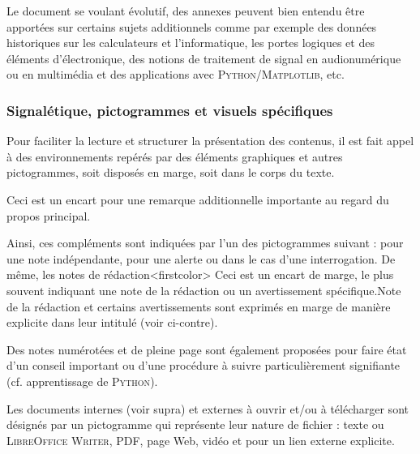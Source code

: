 Le document se voulant évolutif, des annexes peuvent bien entendu être apportées sur certains sujets additionnels comme par exemple des données historiques sur les calculateurs et l'informatique, les portes logiques et des éléments d'électronique, des notions de traitement de signal en audionumérique ou en multimédia et des applications avec \textsc{Python}/\textsc{Matplotlib}, etc.


\subsubsection*{Signalétique, pictogrammes et visuels spécifiques}

Pour faciliter la lecture et structurer la présentation des contenus, il est fait appel à des environnements repérés par des éléments graphiques et autres pictogrammes, soit disposés en marge, soit dans le corps du texte.

\pagebreak
\begin{eyeenv}
Ceci est un encart pour une remarque additionnelle importante au regard du propos principal.
\end{eyeenv}

Ainsi, ces compléments sont indiquées par l'un des pictogrammes suivant : \textcolor{firstcolor}{\faEye} pour une note indépendante, \textcolor{firstcolor}{\faExclamationTriangle} pour une alerte ou \textcolor{firstcolor}{\faQuestion} dans le cas d'une interrogation.
De même, les notes de rédaction\caution[t]<firstcolor>{%
Ceci est un encart de marge, le plus souvent indiquant une note de la rédaction ou un avertissement spécifique.}{Note de la rédaction}
 et certains avertissements sont exprimés en marge de manière explicite dans leur intitulé (voir ci-contre).

\begin{linewidthnote}
Des notes numérotées et de pleine page sont également proposées pour faire état d'un conseil important ou d'une procédure à suivre particulièrement signifiante (cf. apprentissage de \textsc{Python}).
\end{linewidthnote}
\setcounter{linewidthnote}{0}

Les documents internes (voir supra) et externes à ouvrir et/ou à télécharger sont désignés par un pictogramme qui représente leur nature de fichier : \textcolor{secondcolor}{\faFileTextO} texte ou \textsc{LibreOffice} \textsc{Writer}, \textcolor{secondcolor}{\faFilePdfO} PDF, \textcolor{secondcolor}{\faFirefox} page Web, \textcolor{secondcolor}{\faVideoCamera} vidéo et \textcolor{secondcolor}{\faExternalLink} pour un lien externe explicite.

